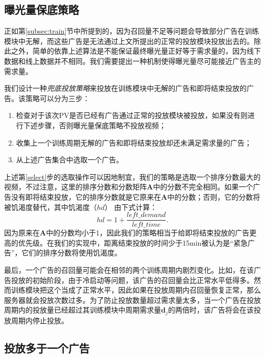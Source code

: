 \subsection{曝光量保底策略} \label{subsec:guarantee}

正如第\ref{subsec:train}节中所提到的，因为召回量不足等问题会导致部分广告在训练模块中无解，而这些广告是无法通过上文所提出的正常的投放模块投放出去的。除此之外，简单的依靠上述算法是不能保证最终曝光量正好等于需求量的，因为线下数据和线上数据并不相同。我们需要提出一种机制使得曝光量尽可能接近广告主的需求量。

我们设计一种\textit{兜底投放策略}来投放在训练模块中无解的广告和即将结束投放的广告。该策略可以分为三步：
\begin{enumerate}
	\item 检查对于该次PV是否已经有广告通过正常的投放模块被投放，如果没有则进行下述步骤，否则曝光量保底策略不投放视频；
	\item 收集上一个训练周期无解的广告和即将结束投放却还未满足需求量的广告；
	\item 从上述广告集合中选取一个广告。\label{select}
\end{enumerate}

上述第\ref{select}步的选取操作可以因地制宜，我们的策略是选取一个排序分数最大的视频，不过注意，这里的排序分数和分数矩阵$\bm{A}$中的分数不完全相同。如果一个广告没有即将结束投放，它的排序分数就是它原来在$\bm{A}$中的分数；否则，它的分数将被饥渴度替代，其中饥渴度（$hd$）
由下式计算：
\begin{equation}
	hd = 1 + \frac{left\_demand}{left\_time}.
\end{equation}
因为原来在$\bm{A}$中的分数均小于1，因此我们的策略相当于给即将结束投放的广告更高的优先级。在我们的实现中，距离结束投放的时间少于15min被认为是“紧急广告”，它们的排序分数将使用饥渴度。

最后，一个广告的召回量可能会在相邻的两个训练周期内剧烈变化。比如，在该广告投放的初始阶段，由于冷启动等问题，该广告的召回量会比正常水平低得多。然而训练模块把这个当成了正常水平，因此如果在投放周期内召回量恢复正常，那么服务器就会投放次数过多。为了防止投放数量超过需求量太多，当一个广告在投放周期内的投放量已经超过其训练模块中周期需求量$\bm{d}_j$的两倍时，该广告将会在该投放周期内停止投放。

\subsection{投放多于一个广告} \label{subsec:more_than_one}

